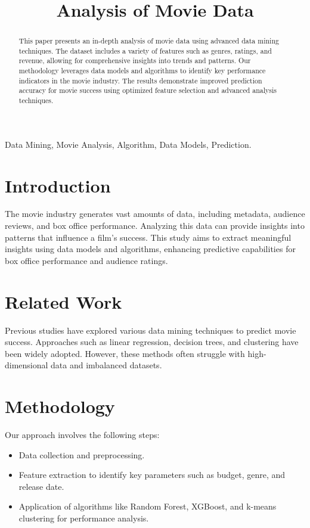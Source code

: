 \documentclass[conference]{IEEEtran}
\begin{document}
\title{Analysis of Movie Data \vspace{-2mm}}

\author{
}

\maketitle

\begin{abstract}
This paper presents an in-depth analysis of movie data using advanced data mining techniques. The dataset includes a variety of features such as genres, ratings, and revenue, allowing for comprehensive insights into trends and patterns. Our methodology leverages data models and algorithms to identify key performance indicators in the movie industry. The results demonstrate improved prediction accuracy for movie success using optimized feature selection and advanced analysis techniques.
\end{abstract}

\begin{IEEEkeywords}
Data Mining, Movie Analysis, Algorithm, Data Models, Prediction.
\end{IEEEkeywords}

\section{Introduction}
The movie industry generates vast amounts of data, including metadata, audience reviews, and box office performance. Analyzing this data can provide insights into patterns that influence a film's success. This study aims to extract meaningful insights using data models and algorithms, enhancing predictive capabilities for box office performance and audience ratings.

\section{Related Work}
Previous studies have explored various data mining techniques to predict movie success. Approaches such as linear regression, decision trees, and clustering have been widely adopted. However, these methods often struggle with high-dimensional data and imbalanced datasets.

\section{Methodology}
Our approach involves the following steps:
\begin{itemize}
    \item Data collection and preprocessing.
    \item Feature extraction to identify key parameters such as budget, genre, and release date.
    \item Application of algorithms like Random Forest, XGBoost, and k-means clustering for performance analysis.
\end{itemize}
\end{document}
